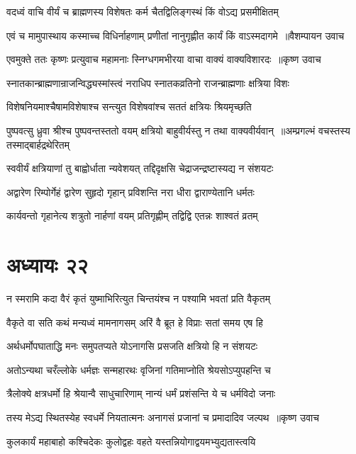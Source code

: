 \twolineshloka
{वदध्वं वाचि वीर्यं च ब्राह्मणस्य विशेषतः}
{कर्म चैतद्विलिङ्गस्थं किं वोऽद्य प्रसमीक्षितम्}


\threelineshloka
{एवं च मामुपास्थाय कस्माच्च विधिर्नाहणाम्}
{प्रणीतां नानुगृह्णीत कार्यं किं वाऽस्मदागमे ॥वैशम्पायन उवाच}
{}


\threelineshloka
{एवमुक्ते ततः कृष्णः प्रत्युवाच महामनाः}
{स्निग्धगमभीरया वाचा वाक्यं वाक्यविशारदः ॥कृष्ण उवाच}
{}


\twolineshloka
{स्नातकान्ब्राह्मणान्राजन्विद्ध्यस्मांस्त्वं नराधिप}
{स्नातकव्रतिनो राजन्ब्राह्मणाः क्षत्रिया विशः}


\twolineshloka
{विशेषनियमाश्चैषामविशेषाश्च सन्त्युत}
{विशेषवांश्च सततं क्षत्रियः श्रियमृच्छति}


\twolineshloka
{पुष्पवत्सु ध्रुवा श्रीश्च पुष्पवन्तस्ततो वयम्}
{क्षत्रियो बाहुवीर्यस्तु न तथा वाक्यवीर्यवान् ॥अम्प्रगल्भं वचस्तस्य तस्माद्बार्हद्रथेरितम्}


\twolineshloka
{स्ववीर्यं क्षत्रियाणां तु बाह्वोर्धाता न्यवेशयत्}
{तद्दिदृक्षसि चेद्राजन्द्रष्टास्यद्य न संशयटः}


\twolineshloka
{अद्वारेण रिम्पोर्गेहं द्वारेण सुहृदो गृहान्}
{प्रविशन्ति नरा धीरा द्वाराण्येतानि धर्मतः}


\twolineshloka
{कार्यवन्तो गृहानेत्य शत्रुतो नार्हणां वयम्}
{प्रतिगृह्णीम् तद्विद्वि एतन्नः शाश्वतं व्रतम्}


\chapter{अध्यायः २२}
\twolineshloka
{न स्मरामि कदा वैरं कृतं युष्माभिरित्युत}
{चिन्तयंश्च न पश्यामि भवतां प्रति वैकृतम्}


\twolineshloka
{वैकृते वा सति कथं मन्यध्वं मामनागसम्}
{अरिं वै ब्रूत हे विप्राः सतां समय एष हि}


\twolineshloka
{अर्थधर्मोपघाताद्धि मनः समुपतप्यते}
{योऽनागसि प्रसजति क्षत्रियो हि न संशयटः}


\twolineshloka
{अतोऽन्यथा चरँल्लोके धर्मज्ञः सन्महारथः}
{वृजिनां गतिमाप्नोति श्रेयसोऽप्युपहन्ति च}


\twolineshloka
{त्रैलोक्ये क्षत्रधर्मो हि श्रेयान्वै साधुचारिणाम्}
{नान्यं धर्मं प्रशंसन्ति ये च धर्मविदो जनाः}


\threelineshloka
{तस्य मेऽद्य स्थितस्येह स्वधर्मे नियतात्मनः}
{अनागसं प्रजानां च प्रमादादिव जल्पथ ॥कृष्ण उवाच}
{}


\twolineshloka
{कुलकार्यं महाबाहो कश्चिदेकः कुलोद्वहः}
{वहते यस्तन्नियोगाद्वयमभ्युद्यतास्त्वयि}


